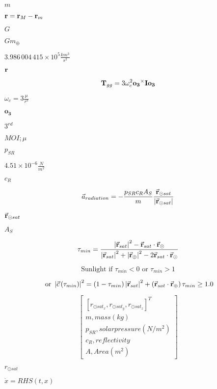 \documentclass{article}
\begin{document}
$m$
\pagebreak

${\bf r}={\bf r}_{M}-{\bf r}_{m}$
\pagebreak

$G$
\pagebreak

$Gm_{\oplus}$
\pagebreak

$3.986\,004\,415\times 10^{5} \frac{km^{3}}{s^{2}}$
\pagebreak

${\bf r}$
\pagebreak

\[ {\bf T}_{gg} = 3\omega _c ^2 {\bf o_3} ^{\times} {\bf{I}}{\bf o_3} \]
\pagebreak

$\omega_c = 3\frac{\mu}{r^{3}}$
\pagebreak

$\mathbf{o_{3}}$
\pagebreak

$3^{rd}$
\pagebreak

$MOI; \mu$
\pagebreak

$p_{SR}$
\pagebreak

$4.51 \times 10^{-6}\frac{N}{m^{2}}$
\pagebreak

$c_{R}$
\pagebreak

\[ \vec{a}_{radiation} = -\frac{p_{SR}c_{R}A_{S}}{m}\frac{\vec{\bf{r}}_{\odot sat}}{\left|\vec{\bf{r}}_{\odot sat}\right|} \]
\pagebreak

$\vec{\bf{r}}_{\odot sat}$
\pagebreak

$A_{S}$
\pagebreak

\[ \tau_{min} = \frac{\left|\vec{\bf{r}}_{sat}\right|^{2}-\vec{\bf{r}}_{sat}\cdot\vec{\bf{r}}_{\odot}}{\left|\vec{\bf{r}}_{sat}\right|^{2} + \left|\vec{\bf{r}}_{\oplus}\right|^{2}-2\vec{\bf{r}}_{sat}\cdot\vec{\bf{r}}_{\odot}} \]
\pagebreak

\[ \mbox{Sunlight if } \tau_{min} < 0\mbox{ or }\tau_{min}>1 \]
\pagebreak

\[ \mbox{ or } \left|\vec{c}\left(\tau_{min}\right)\right|^{2} = \left(1-\tau_{min}\right)\left|\vec{\bf{r}}_{sat}\right|^{2}+\left(\vec{\bf{r}}_{sat}\cdot\vec{\bf{r}}_{\oplus}\right)\tau_{min}\geq 1.0 \]
\pagebreak

\[\begin{bmatrix} \left[r_{\odot sat_{x}}, r_{\odot sat_{y}}, r_{\odot sat_{z}}\right]^{T} \\ m, mass (kg) \\ p_{SR}, solar pressure (N/m^2) \\ c_{R}, reflectivity \\ A, Area (m^2) \end{bmatrix}\]
\pagebreak

$r_{\odot sat}$
\pagebreak

$\dot{x} = RHS(t, x)$
\pagebreak
\end{document}
